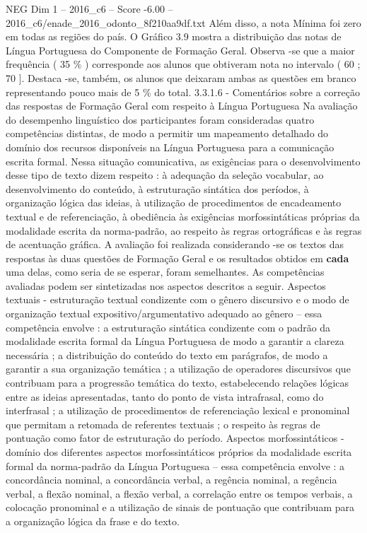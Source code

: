 \begin{textsample}{NEG Dim 1 – 2016\_c6 – Score -6.00 – 2016\_c6/enade\_2016\_odonto\_8f210aa9df.txt}
Além disso, a nota Mínima foi zero em todas as regiões do país.
O Gráfico 3.9 mostra a distribuição das notas de Língua Portuguesa do Componente de Formação Geral.
Observa -se que a maior frequência ( 35 \% ) corresponde aos alunos que obtiveram nota no intervalo ( 60 ; 70 ].
Destaca -se, também, os alunos que deixaram ambas as questões em branco representando pouco mais de 5 \% do total. 3.3.1.6 - Comentários sobre a correção das respostas de Formação Geral com respeito à Língua Portuguesa Na avaliação do desempenho linguístico dos participantes foram consideradas quatro competências distintas, de modo a permitir um mapeamento detalhado do domínio dos recursos disponíveis na Língua Portuguesa para a comunicação escrita formal.
Nessa situação comunicativa, as exigências para o desenvolvimento desse tipo de texto dizem respeito : à adequação da seleção vocabular, ao desenvolvimento do conteúdo, à estruturação sintática dos períodos, à organização lógica das ideias, à utilização de procedimentos de encadeamento textual e de referenciação, à obediência às exigências morfossintáticas próprias da modalidade escrita da norma-padrão, ao respeito às regras ortográficas e às regras de acentuação gráfica.
A avaliação foi realizada considerando -se os textos das respostas às duas questões de Formação Geral e os resultados obtidos em \textbf{cada} uma delas, como seria de se esperar, foram semelhantes.
As competências avaliadas podem ser sintetizadas nos aspectos descritos a seguir.
Aspectos textuais - estruturação textual condizente com o gênero discursivo e o modo de organização textual expositivo/argumentativo adequado ao gênero – essa competência envolve : a estruturação sintática condizente com o padrão da modalidade escrita formal da Língua Portuguesa de modo a garantir a clareza necessária ; a distribuição do conteúdo do texto em parágrafos, de modo a garantir a sua organização temática ; a utilização de operadores discursivos que contribuam para a progressão temática do texto, estabelecendo relações lógicas entre as ideias apresentadas, tanto do ponto de vista intrafrasal, como do interfrasal ; a utilização de procedimentos de referenciação lexical e pronominal que permitam a retomada de referentes textuais ; o respeito às regras de pontuação como fator de estruturação do período.
Aspectos morfossintáticos - domínio dos diferentes aspectos morfossintáticos próprios da modalidade escrita formal da norma-padrão da Língua Portuguesa – essa competência envolve : a concordância nominal, a concordância verbal, a regência nominal, a regência verbal, a flexão nominal, a flexão verbal, a correlação entre os tempos verbais, a colocação pronominal e a utilização de sinais de pontuação que contribuam para a organização lógica da frase e do texto.

\end{textsample}
